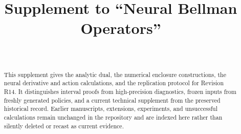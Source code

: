 \documentclass[ecta]{econsocart}
\theoremstyle{remark}
\begin{document}
\begin{frontmatter}
\title{Supplement to ``Neural Bellman Operators''}
\begin{aug}
\author[id=au1,addressref={add1}]{~}
\address[id=add1]{}
\end{aug}
\begin{abstract}
This supplement gives the analytic dual, the numerical enclosure constructions, the neural derivative and action calculations, and the replication protocol for Revision R14. It distinguishes interval proofs from high-precision diagnostics, frozen inputs from freshly generated policies, and a current technical supplement from the preserved historical record. Earlier manuscripts, extensions, experiments, and unsuccessful calculations remain unchanged in the repository and are indexed here rather than silently deleted or recast as current evidence.
\end{abstract}
\end{frontmatter}


\end{document}
